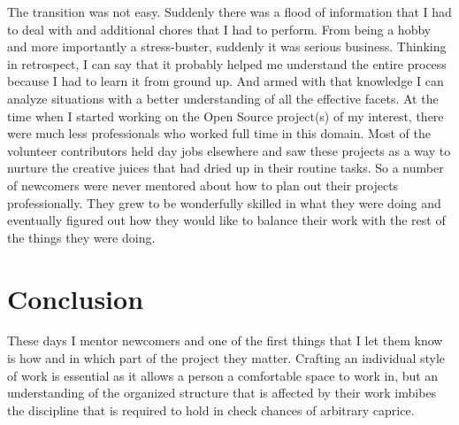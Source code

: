 The transition was not easy. Suddenly there was a flood of information that I
had to deal with and additional chores that I had to perform. From being a hobby
and more importantly a stress-buster, suddenly it was serious business. Thinking
in retrospect, I can say that it probably helped me understand the entire
process because I had to learn it from ground up. And armed with that knowledge
I can analyze situations with a better understanding of all the effective
facets. At the time when I started working on the Open Source project(s) of my
interest, there were much less professionals who worked full time in this
domain. Most of the volunteer contributors held day jobs elsewhere and saw these
projects as a way to nurture the creative juices that had dried up in their
routine tasks. So a number of newcomers were never mentored about how to plan
out their projects professionally. They grew to be wonderfully skilled in what
they were doing and eventually figured out how they would like to balance their work
with the rest of the things they were doing.

\section*{Conclusion}

These days I mentor newcomers and one of the first things that I let them know
is how and in which part of the project they matter. Crafting an individual
style of work is essential as it allows a person a comfortable space to work in,
but an understanding of the organized structure that is affected by their work
imbibes the discipline that is required to hold in check chances of arbitrary
caprice.
